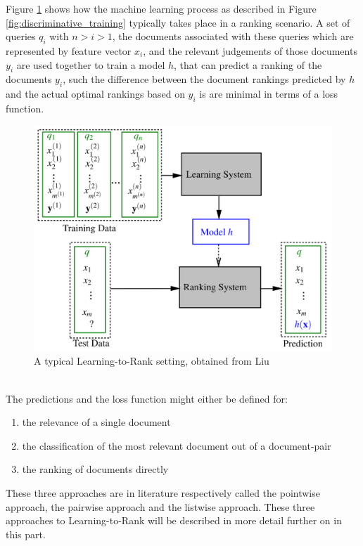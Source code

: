 Figure \ref{fig:ltr_framework} shows how the machine learning process as described in Figure \ref{fig:discriminative_training} typically takes place in a ranking scenario. A set of queries $q_i$ with $n > i > 1$, the documents associated with these queries which are represented by feature vector $x_i$, and the relevant judgements of those documents $y_i$ are used together to train a model $h$, that can predict a ranking of the documents $y_i$, such the difference between the document rankings predicted by $h$ and the actual optimal rankings based on $y_i$ is are minimal in terms of a loss function.
\begin{figure}[!h]
\includegraphics[scale=0.25]{gfx/ltr_framework}
\caption{A typical Learning-to-Rank setting, obtained from Liu\cite{Liu2007}}
\label{fig:ltr_framework}
\end{figure}\\

The predictions and the loss function might either be defined for:
\begin{enumerate}
\item the relevance of a single document
\item the classification of the most relevant document out of a document-pair
\item the ranking of documents directly
\end{enumerate}
These three approaches are in literature respectively called the pointwise approach, the pairwise approach and the listwise approach. These three approaches to Learning-to-Rank will be described in more detail further on in this part.

